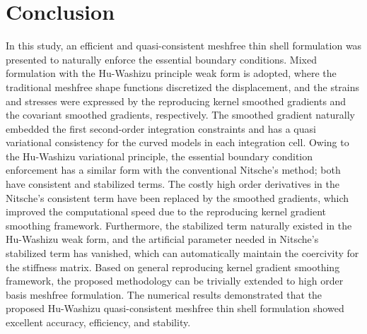 \section{Conclusion}\label{conclusion}
In this study, an efficient and quasi-consistent meshfree thin shell formulation was presented to naturally enforce the essential boundary conditions.  Mixed formulation with the Hu-Washizu principle weak form is adopted, where the traditional meshfree shape functions discretized the displacement, and the strains and stresses were expressed by the reproducing kernel smoothed gradients and the covariant smoothed gradients, respectively. The smoothed gradient naturally embedded the first second-order integration constraints and has a quasi variational consistency for the curved models in each integration cell. Owing to the Hu-Washizu variational principle, the essential boundary condition enforcement has a similar form with the conventional Nitsche’s method; both have consistent and stabilized terms. The costly high order derivatives in the Nitsche’s consistent term have been replaced by the smoothed gradients, which improved the computational speed due to the reproducing kernel gradient smoothing framework. Furthermore, the stabilized term naturally existed in the Hu-Washizu weak form, and the artificial parameter needed in Nitsche’s stabilized term has vanished, which can automatically maintain the coercivity for the stiffness matrix. Based on general reproducing kernel gradient smoothing framework, the proposed methodology can be trivially extended to high order basis meshfree formulation. The numerical results demonstrated that the proposed Hu-Washizu quasi-consistent meshfree thin shell formulation showed excellent accuracy, efficiency, and stability.

